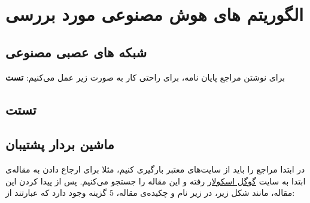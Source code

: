 \chapter{الگوریتم های هوش مصنوعی مورد بررسی}
\section{شبکه های عصبی مصنوعی}
برای نوشتن مراجع پایان نامه، برای راحتی کار به صورت زیر عمل می‌کنیم:
\textbf{تست}
\section*{تستت}
\section{ماشین بردار پشتیبان}
در ابتدا مراجع را باید از سایت‌های معتبر بارگیری کنیم، مثلا برای ارجاع دادن به مقاله‌ی
ابتدا به سایت
\href{scholar.google.com}{گوگل اسکولار} 
رفته و این مقاله را جستجو می‌کنیم. پس از پیدا کردن این مقاله، مانند شکل زیر، در زیر نام و چکیده‌ی مقاله، $5$ گزینه وجود دارد که عبارتند از:\\

